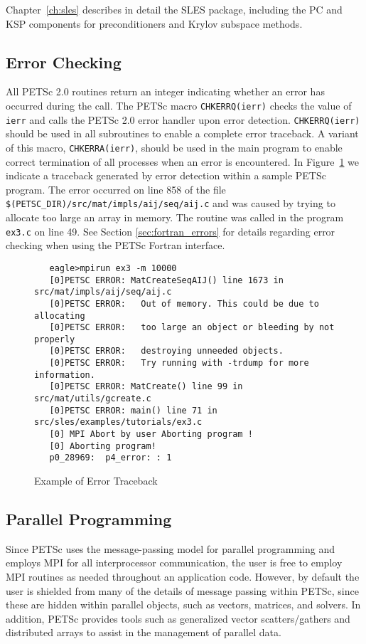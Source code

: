 {Chapter~\ref{ch:sles} describes in detail the SLES package, including
the PC and KSP components for preconditioners and Krylov subspace methods.

\subsection*{Error Checking}

All PETSc 2.0 routines return an integer indicating whether an error
has occurred during the call.  The PETSc macro {\tt CHKERRQ(ierr)}
checks the value of {\tt ierr} and calls the PETSc 2.0 error handler
upon error detection.  {\tt CHKERRQ(ierr)} should be used in all
subroutines to enable a complete error traceback.  A variant of this
macro, {\tt CHKERRA(ierr)}, should be used in the main program to
enable correct termination of all processes when an error is
encountered.  In Figure~\ref{fig:traceback} we indicate a
traceback generated by error detection within a sample PETSc
program. The error occurred on line 858 of the file {\tt
\$(PETSC\_DIR)/src/mat/impls/aij/seq/aij.c} and was caused by trying to allocate too
large an array in memory. The routine was called in the program 
{\tt ex3.c} on line 49.  See Section \ref{sec:fortran_errors} for
details regarding error checking when using the PETSc Fortran interface.

\begin{figure}[H]
{\small
\begin{verbatim}
   eagle>mpirun ex3 -m 10000
   [0]PETSC ERROR: MatCreateSeqAIJ() line 1673 in src/mat/impls/aij/seq/aij.c
   [0]PETSC ERROR:   Out of memory. This could be due to allocating
   [0]PETSC ERROR:   too large an object or bleeding by not properly
   [0]PETSC ERROR:   destroying unneeded objects.
   [0]PETSC ERROR:   Try running with -trdump for more information. 
   [0]PETSC ERROR: MatCreate() line 99 in src/mat/utils/gcreate.c  
   [0]PETSC ERROR: main() line 71 in src/sles/examples/tutorials/ex3.c  
   [0] MPI Abort by user Aborting program !
   [0] Aborting program!
   p0_28969:  p4_error: : 1
\end{verbatim}
}
\nobreak
\caption{Example of Error Traceback}
\label{fig:traceback}
\end{figure}

\subsection*{Parallel Programming}

Since PETSc uses the message-passing model for
parallel programming and employs MPI for all interprocessor
communication, the user is free to employ MPI routines as needed
throughout an application code.  However, by default the user is
shielded from many of the details of message passing within PETSc,
since these are hidden within parallel objects, such as vectors,
matrices, and solvers.  In addition, PETSc provides tools such as
generalized vector scatters/gathers and distributed arrays to assist
in the management of parallel data.

}
